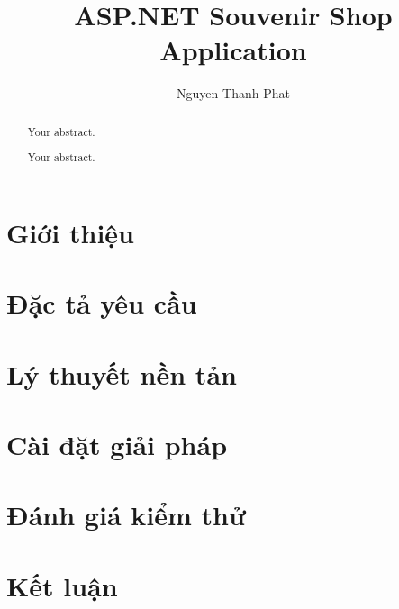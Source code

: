 \documentclass[a4paper,12pt,oneside]{report}
\title{ASP.NET Souvenir Shop Application}
\author{Nguyen Thanh Phat}
\begin{document}



\tableofcontents
\listoffigures
\listoftables


\begin{abstract}
    Your abstract.
\end{abstract}

\begin{abstract}
    Your abstract.
\end{abstract}

\chapter{Giới thiệu}


\chapter{Đặc tả yêu cầu}


\chapter{Lý thuyết nền tản}


\chapter{Cài đặt giải pháp}


\chapter{Đánh giá kiểm thử}


\chapter{Kết luận}




\end{document}
